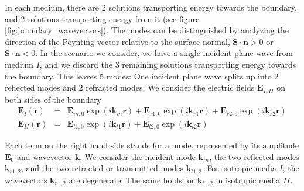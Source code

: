 \documentclass[12pt,a4paper,twoside,openright,BCOR10mm,headsepline,titlepage,abstracton,chapterprefix,final]{scrreprt}
\newcommand\Vector[1]{{\mathbf{#1}}}
\newcommand\Location{\Vector{r}}
\newcommand\wavenumber{k}
\newcommand\Wavevector{\Vector{\wavenumber}}
\newcommand\scalarEfield{E}
\newcommand\Efield{\Vector{\scalarEfield}}
\newcommand\materialone{I}
\newcommand\materialtwo{{II}}
\begin{document}
In each medium, there are 2 solutions transporting energy towards the boundary, 
and 2 solutions transporting energy from it (see figure \ref{fig:boundary_wavevectors}).
The modes can be distinguished by analyzing the direction of the Poynting vector relative to the surface normal,
$\Vector{S}\cdot\Vector{n}>0$ or $\Vector{S}\cdot\Vector{n}<0$.
In the scenario we consider, we have a single incident plane wave from medium $\materialone$, 
and we discard the 3 remaining solutions transporting energy towards the boundary.
This leaves 5 modes: One incident plane wave splits up into 2 reflected modes and 2 refracted modes.
We consider the electric fields $\Efield_{\materialone,\materialtwo}$ on both sides of the boundary
\begin{subequations}
\begin{eqnarray}
 \Efield_\materialone(\Location) &=& \Efield_{in,0} \exp(i \Wavevector_{in} \Location) + \Efield_{r1,0} \exp(i \Wavevector_{r1} \Location) + \Efield_{r2,0} \exp(i \Wavevector_{r2} \Location)  \\
 \Efield_\materialtwo(\Location) &=& \Efield_{t1,0} \exp(i \Wavevector_{t1} \Location) + \Efield_{t2,0} \exp(i \Wavevector_{t2} \Location)
\end{eqnarray}
\label{eq:modes_on_boundary} 
\end{subequations}

Each term on the right hand side stands for a mode, represented by its amplitude $\Efield_{0}$ and wavevector $\Wavevector$.
We consider the incident mode $\Wavevector_{in}$, 
the two reflected modes $\Wavevector_{r1,2}$,
and the two refracted or transmitted modes $\Wavevector_{t1,2}$.
For isotropic media $\materialone$, the wavevectors $\Wavevector_{r1,2}$ are degenerate. 
The same holds for $\Wavevector_{t1,2}$ in isotropic media $\materialtwo$.
\end{document}
